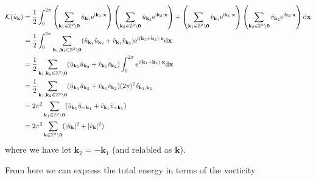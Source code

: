 \documentclass[9pt]{article}
\newcommand{\ii}{\mathrm{i}}      								  %
\newcommand{\e}{\mathrm{e}}      								  %
\newcommand{\bfx}{\mathbf{x}}								%
\newcommand{\bfk}{\mathbf{k}}								%
\newcommand{\bfkn}[1]{\mathbf{k}_{#1}}								%
\begin{document}
\begin{align}
\mathcal{K}(\hat{u}_{\bfk})	&= \frac{1}{2}\int_0^{2\pi} \left(\sum_{\mathbf{k}_1\in \mathbb{Z}^2\setminus \mathbf{0}}\hat{u}_{\mathbf{k}_1}\e^{\ii \mathbf{k}_1\cdot \mathbf{x}}\right)\left(\sum_{\mathbf{k}_2\in \mathbb{Z}^2\setminus \mathbf{0}}\hat{u}_{\mathbf{k}_2}\e^{\ii \mathbf{k}_2\cdot \mathbf{x}}\right) + \left(\sum_{\mathbf{k}_1\in \mathbb{Z}^2\setminus \mathbf{0}}\hat{v}_{\mathbf{k}_1}\e^{\ii \mathbf{k}_1\cdot \mathbf{x}}\right)\left(\sum_{\mathbf{k}_2\in \mathbb{Z}^2\setminus \mathbf{0}}\hat{v}_{\mathbf{k}_2}\e^{\ii \mathbf{k}_2\cdot \mathbf{x}}\right) \mathrm{d}\bfx \notag\\
	&= \frac{1}{2}\int_0^{2\pi} \sum_{\mathbf{k}_1, \mathbf{k}_2\in \mathbb{Z}^2\setminus \mathbf{0}} (\hat{u}_{\mathbf{k}_1}\hat{u}_{\mathbf{k}_2} + \hat{v}_{\mathbf{k}_1}\hat{v}_{\mathbf{k}_2}) \e^{\ii (\mathbf{k}_1 + \mathbf{k}_2)\cdot \mathbf{x}} \mathrm{d}\bfx \notag \\
	&= \frac{1}{2}\sum_{\mathbf{k}_1, \mathbf{k}_2\in \mathbb{Z}^2\setminus \mathbf{0}} (\hat{u}_{\mathbf{k}_1}\hat{u}_{\mathbf{k}_2} + \hat{v}_{\mathbf{k}_1}\hat{v}_{\mathbf{k}_2}) \int_0^{2\pi} \e^{\ii (\mathbf{k}_1 + \mathbf{k}_2)\cdot \mathbf{x}} \mathrm{d}\bfx \notag \\
	&= \frac{1}{2}\sum_{\mathbf{k}_1, \mathbf{k}_2\in \mathbb{Z}^2\setminus \mathbf{0}} (\hat{u}_{\mathbf{k}_1}\hat{u}_{\mathbf{k}_2} + \hat{v}_{\mathbf{k}_1}\hat{v}_{\mathbf{k}_2}) (2\pi)^2 \delta_{\bfkn{1}, \bfkn{2}} \notag \\
	&= 2\pi^2 \sum_{\mathbf{k}_1\in \mathbb{Z}^2\setminus \mathbf{0}} (\hat{u}_{\mathbf{k}_1}\hat{u}_{-\mathbf{k}_1} + \hat{v}_{\mathbf{k}_1}\hat{v}_{-\mathbf{k}_{1}}) \notag \\
	&= 2\pi^2 \sum_{\mathbf{k}\in \mathbb{Z}^2\setminus \mathbf{0}} (|\hat{u}_{\mathbf{k}}|^2 + |\hat{v}_{\mathbf{k}}|^2)
	\label{eq:energy_u_fourier}
\end{align}
where we have let $\bfkn{2} = - \bfkn{1}$ (and relabled as $\bfk$).

From here we can express the total energy in terms of the vorticity 
\end{document}

